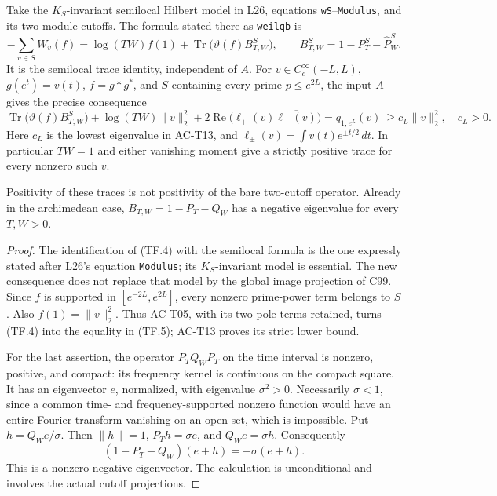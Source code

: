 \begin{proposition}
\label{AC-T20}
Take the \(K_S\)-invariant semilocal Hilbert model in L26,
equations \texttt{wS}--\texttt{Modulus}, and its two module cutoffs.
The formula stated there as \texttt{weilqb} is
\[
 -\sum_{v\in S}W_v(f)
   =\log(TW)f(1)+
      \operatorname{Tr}\bigl(\vartheta(f)B^S_{T,W}\bigr),
 \qquad B^S_{T,W}=1-P^S_T-\widehat P^S_W.
 \tag{TF.4}
\]
It is the semilocal trace identity, independent of \(A\).
For \(v\in C_c^\infty(-L,L)\), \(g(e^t)=v(t)\),
\(f=g*g^*\), and \(S\) containing every prime \(p\le e^{2L}\),
the input \(A\) gives the precise consequence
\[
 \operatorname{Tr}\bigl(\vartheta(f)B^S_{T,W}\bigr)
 +\log(TW)\|v\|_2^2
 +2\operatorname{Re}\bigl(\ell_+(v)\overline{\ell_-(v)}\bigr)
 =q_{1,e^L}(v)\ \geq c_L\|v\|_2^2,
 \quad c_L>0.
 \tag{TF.5}
\]
Here \(c_L\) is the lowest eigenvalue in AC-T13, and
\(\ell_\pm(v)=\int v(t)e^{\pm t/2}\,dt\).
In particular \(TW=1\) and either vanishing moment give a
strictly positive trace for every nonzero such \(v\).

Positivity of these traces is not positivity of the bare
two-cutoff operator.  Already in the archimedean case,
\(B_{T,W}=1-P_T-Q_W\) has a negative eigenvalue for every
\(T,W>0\).
\end{proposition}
\begin{proof}
The identification of (TF.4) with the semilocal formula is the
one expressly stated after L26's equation \texttt{Modulus};
its \(K_S\)-invariant model is essential.  The new consequence
does not replace that model by the global image projection
of C99.  Since \(f\) is supported in
\([e^{-2L},e^{2L}]\), every nonzero prime-power term belongs
to \(S\).  Also \(f(1)=\|v\|_2^2\).  Thus AC-T05, with its
two pole terms retained, turns (TF.4) into the equality in
(TF.5); AC-T13 proves its strict lower bound.

For the last assertion, the operator \(P_TQ_WP_T\) on the
time interval is nonzero, positive, and compact: its
frequency kernel is continuous on the compact square.
It has an eigenvector \(e\), normalized, with eigenvalue
\(\sigma^2>0\).  Necessarily \(\sigma<1\), since a common
time- and frequency-supported nonzero function would have
an entire Fourier transform vanishing on an open set,
which is impossible.  Put \(h=Q_We/\sigma\).
Then \(\|h\|=1\), \(P_Th=\sigma e\), and \(Q_We=\sigma h\).
Consequently
\[
 (1-P_T-Q_W)(e+h)=-\sigma(e+h).
 \tag{TF.6}
\]
This is a nonzero negative eigenvector.  The calculation is
unconditional and involves the actual cutoff projections.
\end{proof}

